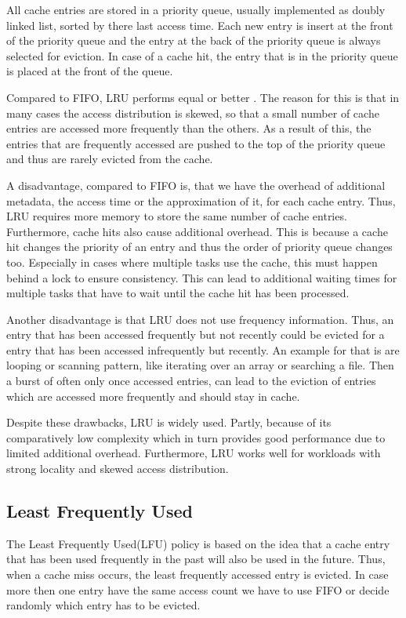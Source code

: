 \documentclass[
	12pt,
	a4paper,
	abstract,
	bibliography=totoc,
	chapterprefix,
	headings=openright,
	numbers=endperiod,
	parskip=half,
	twoside,
]{scrreprt}
\begin{document}
All cache entries are stored in a priority queue, usually implemented as doubly linked list, sorted by there last access time.
Each new entry is insert at the front of the priority queue and the entry at the back of the priority queue is always selected for eviction.
In case of a cache hit, the entry that is in the priority queue is placed at the front of the queue.

Compared to FIFO, LRU performs equal or better \cite{van1992lru}.
The reason for this is that in many cases the access distribution is skewed, so that a small number of 
cache entries are accessed more frequently than the others.
As a result of this, the entries that are frequently accessed are pushed to the top of the priority queue and 
thus are rarely evicted from the cache.

A disadvantage, compared to FIFO is, that we have the overhead of additional metadata, the access time or the approximation of it, 
for each cache entry.
Thus, LRU requires more memory to store the same number of cache entries.
Furthermore, cache hits also cause additional overhead. 
This is because a cache hit changes the priority of an entry and thus the order of priority queue changes too.
Especially in cases where multiple tasks use the cache, this must happen behind a lock to ensure consistency.
This can lead to additional waiting times for multiple tasks that have to wait until the cache hit has been processed.

Another disadvantage is that LRU does not use frequency information.
Thus, an entry that has been accessed frequently but not recently could be evicted for a entry that has been accessed infrequently but recently.
An example for that is are looping or scanning pattern, like iterating over an array or searching a file.
Then a burst of often only once accessed entries, can lead to the eviction of entries which are accessed more frequently and 
should stay in cache.

Despite these drawbacks, LRU is widely used.
Partly, because of its comparatively low complexity 
which in turn provides good performance due to limited additional overhead.
Furthermore, LRU works well for workloads with strong locality and skewed access distribution.

\subsection{Least Frequently Used}

The Least Frequently Used(LFU) policy is based on the idea that a cache entry that has been used frequently in the past will 
also be used in the future.
Thus, when a cache miss occurs, the least frequently accessed entry is evicted.
In case more then one entry have the same access count we have to use FIFO or decide randomly which entry has to be evicted.
\end{document}
